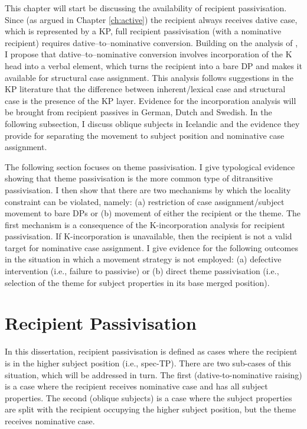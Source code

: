 This chapter will start be discussing the availability of recipient passivisation. Since (as argued in Chapter \ref{ch:active}) the recipient always receives dative case, which is represented by a KP, full recipient passivisation (with a nominative recipient) requires dative--to--nominative conversion. Building on the analysis of \cite{Alexiadou.2014}, I propose that dative--to--nominative conversion involves incorporation of the K head into a verbal element, which turns the recipient into a bare DP and makes it available for structural case assignment. This analysis follows suggestions in the KP literature that the difference between inherent/lexical case and structural case is the presence of the KP layer. Evidence for the incorporation analysis will be brought from recipient passives in German, Dutch and Swedish. In the following subsection, I discuss oblique subjects in Icelandic and the evidence they provide for separating the movement to subject position and nominative case assignment.

The following section focuses on theme passivisation. I give typological evidence showing that theme passivisation is the more common type of ditransitive passivisation. I then show that there are two mechanisms by which the locality constraint can be violated, namely: (a) restriction of case assignment/subject movement to bare DPs or (b) movement of either the recipient or the theme. The first mechanism is a consequence of the K-incorporation analysis for recipient passivisation. If K-incorporation is unavailable, then the recipient is not a valid target for nominative case assignment. I give evidence for the following outcomes in the situation in which a movement strategy is not employed: (a) defective intervention (i.e., failure to passivise) or (b) direct theme passivisation (i.e., selection of the theme for subject properties in its base merged position).

\section{Recipient Passivisation}
In this dissertation, recipient passivisation is defined as cases where the recipient is in the higher subject position (i.e., spec-TP). There are two sub-cases of this situation, which will be addressed in turn. The first (dative-to-nominative raising) is a case where the recipient receives nominative case and has all subject properties. The second (oblique subjects) is a case where the subject properties are split with the recipient occupying the higher subject position, but the theme receives nominative case.

